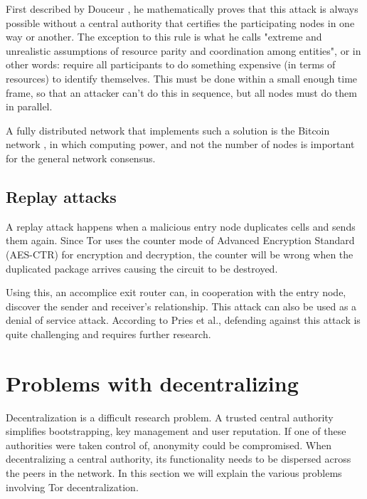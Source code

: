 \documentclass{article}
\begin{document}
		First described by Douceur \cite{douceur2002sybil}, he mathematically proves that this attack is always possible without a central authority that certifies the participating nodes in one way or another. The exception to this rule is what he calls "extreme and unrealistic assumptions of resource parity and coordination among entities", or in other words: require all participants to do something expensive (in terms of resources) to identify themselves. This must be done within a small enough time frame, so that an attacker can't do this in sequence, but all nodes must do them in parallel.
		
		A fully distributed network that implements such a solution is the Bitcoin network \cite{nakamoto2008bitcoin}, in which computing power, and not the number of nodes is important for the general network consensus.
				
	\subsection{Replay attacks}
		A replay attack \cite{pries2008new} happens when a malicious entry node duplicates cells and sends them again. Since Tor uses the counter mode of Advanced Encryption Standard (AES-CTR) for encryption and decryption, the counter will be wrong when the duplicated package arrives causing the circuit to be destroyed.

		Using this, an accomplice exit router can, in cooperation with the entry node, discover the sender and receiver's relationship. This attack can also be used as a denial of service attack. According to Pries et al., defending against this attack is quite challenging and requires further research.

\section{Problems with decentralizing}
	\label{sec:problems}

	Decentralization is a difficult research problem. A trusted central authority simplifies bootstrapping, key management and user reputation. If one of these authorities were taken control of, anonymity could be compromised. When decentralizing a central authority, its functionality needs to be dispersed across the peers in the network. In this section we will explain the various problems involving Tor decentralization.
	
\end{document}
